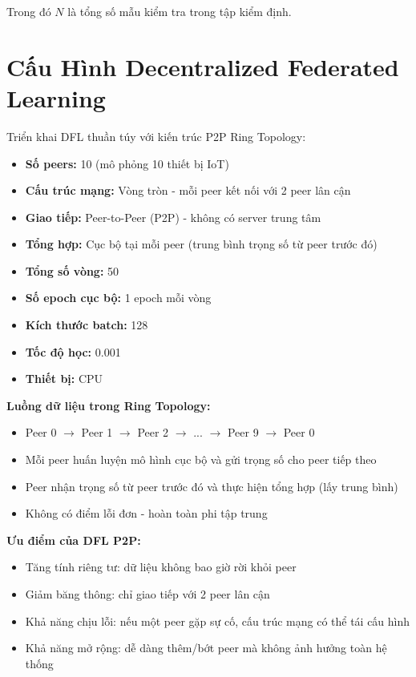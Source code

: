 Trong đó $N$ là tổng số mẫu kiểm tra trong tập kiểm định.

\section{Cấu Hình Decentralized Federated Learning}

Triển khai DFL thuần túy với kiến trúc P2P Ring Topology:

\begin{itemize}
    \item \textbf{Số peers:} 10 (mô phỏng 10 thiết bị IoT)
    \item \textbf{Cấu trúc mạng:} Vòng tròn - mỗi peer kết nối với 2 peer lân cận
    \item \textbf{Giao tiếp:} Peer-to-Peer (P2P) - không có server trung tâm
    \item \textbf{Tổng hợp:} Cục bộ tại mỗi peer (trung bình trọng số từ peer trước đó)
    \item \textbf{Tổng số vòng:} 50
    \item \textbf{Số epoch cục bộ:} 1 epoch mỗi vòng
    \item \textbf{Kích thước batch:} 128
    \item \textbf{Tốc độ học:} 0.001
    \item \textbf{Thiết bị:} CPU
\end{itemize}

\textbf{Luồng dữ liệu trong Ring Topology:} 
\begin{itemize}
    \item Peer 0 $\rightarrow$ Peer 1 $\rightarrow$ Peer 2 $\rightarrow$ ... $\rightarrow$ Peer 9 $\rightarrow$ Peer 0
    \item Mỗi peer huấn luyện mô hình cục bộ và gửi trọng số cho peer tiếp theo
    \item Peer nhận trọng số từ peer trước đó và thực hiện tổng hợp (lấy trung bình)
    \item Không có điểm lỗi đơn - hoàn toàn phi tập trung
\end{itemize}

\textbf{Ưu điểm của DFL P2P:} 
\begin{itemize}
    \item Tăng tính riêng tư: dữ liệu không bao giờ rời khỏi peer
    \item Giảm băng thông: chỉ giao tiếp với 2 peer lân cận
    \item Khả năng chịu lỗi: nếu một peer gặp sự cố, cấu trúc mạng có thể tái cấu hình
    \item Khả năng mở rộng: dễ dàng thêm/bớt peer mà không ảnh hưởng toàn hệ thống
\end{itemize}

